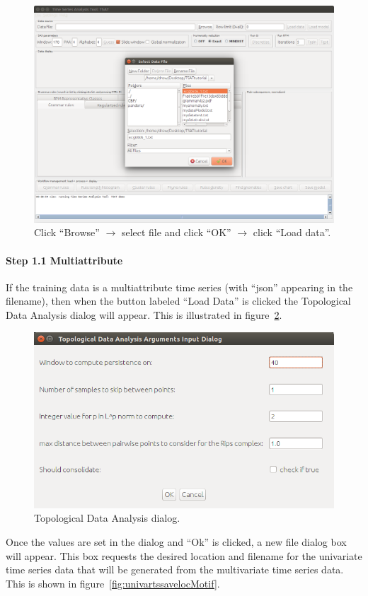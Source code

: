 \documentclass[titlepage, letterpaper, 12pt]{article}
\begin{document}
\begin{figure}[H]
	\centering
	\includegraphics[width=0.7\linewidth]{pictures/motifguide/step1-browse}
	\caption{Click ``Browse'' $\rightarrow$ select file and click ``OK'' $\rightarrow$ click ``Load data''.}
	\label{fig:step1-browse}
\end{figure}

\paragraph{Step 1.1 Multiattribute}
If the training data is a multiattribute time series (with ``json'' appearing in the filename), then when the button labeled ``Load Data'' is clicked the Topological Data Analysis dialog will appear.  This is illustrated in figure~\ref{fig:tda-args-dialogMotif}. 

\begin{figure}
	\centering
	\includegraphics[width=\textwidth]{pictures/TDA-args-dialog}
	\caption{Topological Data Analysis dialog.}
	\label{fig:tda-args-dialogMotif}
\end{figure}

Once the values are set in the dialog and ``Ok'' is clicked, a new file dialog box will appear.  This box requests the desired location and filename for the univariate time series data that will be generated from the multivariate time series data.  This is shown in figure~\ref{fig:univartssavelocMotif}.
\end{document}
